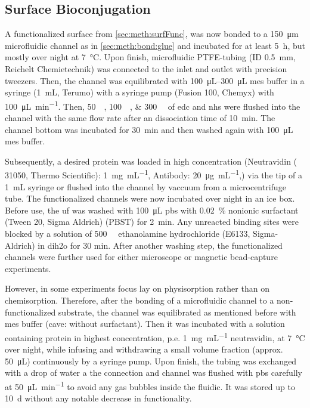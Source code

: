 \subsection{Surface Bioconjugation}
\label{sec:meth:surfBio}
A functionalized surface from \ref{sec:meth:surfFunc}, was now bonded to a \SI{150}{\micro\meter} microfluidic channel as in \ref{sec:meth:bond:glue} and incubated for at least \SI{5}{\hour}, but mostly over night at \SI{7}{\degreeCelsius}. Upon finish, microfluidic PTFE-tubing (ID \SI{0.5}{\milli\meter}, Reichelt Chemietechnik) was connected to the inlet and outlet with precision tweezers. Then, the channel was equilibrated with \SIrange{100}{300}{\micro\liter} \gls{mes} buffer in a syringe (\SI{1}{\milli\liter}, Terumo) with a syringe pump (Fusion 100, Chemyx) with \SI{100}{\micro\liter\per\minute}. Then, \SIlist{50;100;300}{\milli\molar} of \gls{edc} and \gls{nhs} were flushed into the channel with the same flow rate after an dissociation time of \SI{10}{\minute}. The channel bottom was incubated for \SI{30}{\minute} and then washed again with \SI{100}{\micro\liter} \gls{mes} buffer. 

Subsequently, a desired protein was loaded in high concentration (Neutravidin ( 31050, Thermo Scientific): \SI{1}{\milli\gram\per\milli\liter}, Antibody: \SI{20}{\micro\gram\per\milli\liter},) via the tip of a \SI{1}{\milli\liter} syringe or flushed into the channel by vaccuum from a microcentrifuge tube. The functionalized channels were now incubated over night in an ice box. Before use, the \gls{uf} was washed with \SI{100}{\micro\liter} \gls{pbs} with \SI{0.02}{\percent} nonionic surfactant (Tween 20, Sigma Aldrich) (PBST) for \SI{2}{\minute}. Any unreacted binding sites were blocked by a solution of \SI{500}{\milli\molar} ethanolamine hydrochloride (E6133, Sigma-Aldrich) in \gls{dih2o} for 30 min. After another washing step, the functionalized channels were further used for either microscope or magnetic bead-capture experiments.

However, in some experiments focus lay on physisorption rather than on chemisorption. Therefore, after the bonding of a microfluidic channel to a non-functionalized substrate, the channel was equilibrated as mentioned before with \gls{mes} buffer (cave: without surfactant). Then it was incubated with a solution containing protein in highest concentration, p.e. \SI{1}{\milli\gram\per\milli\liter} neutravidin, at \SI{7}{\degreeCelsius} over night, while infusing and withdrawing a small volume fraction (approx. \SI{50}{\micro\liter}) continuously by a syringe pump. Upon finish, the tubing was exchanged with a drop of water a the connection and channel was flushed with \gls{pbs} carefully at \SI{50}{\micro\liter\per\minute} to avoid any gas bubbles inside the fluidic. It was stored up to \SI{10}{\day} without any notable decrease in functionality.

